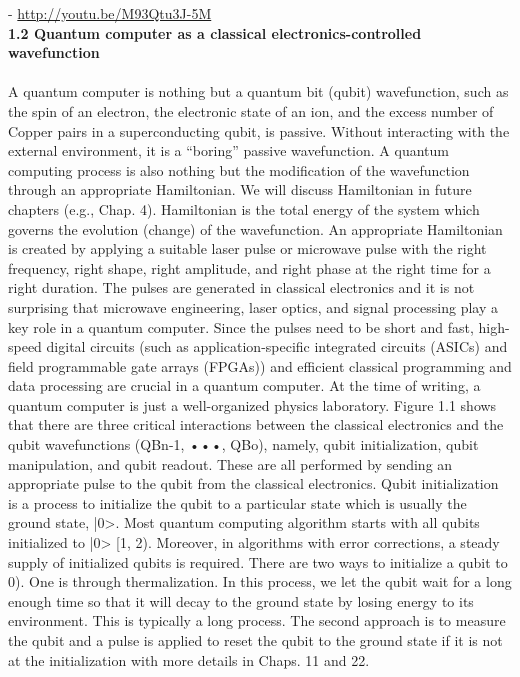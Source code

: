 \documentclass{article}
\begin{document}
- \url{http://youtu.be/M93Qtu3J-5M}
\\[20pt]
\textbf{\large1.2 Quantum computer as a classical electronics-controlled wavefunction
}
\\\\
A quantum computer is nothing but a quantum bit (qubit) wavefunction, such as the spin of an electron, the electronic state of an ion, and the excess number of Copper pairs in a superconducting qubit, is passive. Without interacting with the external environment, it is a “boring” passive wavefunction. A quantum computing process is also nothing but the modification of the wavefunction through an appropriate Hamiltonian. We will discuss Hamiltonian in future chapters (e.g., Chap. 4). Hamiltonian is the total energy of the system which governs the evolution (change) of the wavefunction. An appropriate Hamiltonian is created by applying a suitable laser pulse or microwave pulse with the right frequency, right shape, right amplitude, and right phase at the right time for a right duration. The pulses are generated in classical electronics and it is not surprising that microwave engineering, laser optics, and signal processing play a key role in a quantum computer. Since the pulses need to be short and fast, high-speed digital circuits (such as application-specific integrated circuits (ASICs) and field programmable gate arrays (FPGAs)) and efficient classical programming and data processing are crucial in a quantum computer.
At the time of writing, a quantum computer is just a well-organized physics laboratory.
Figure 1.1 shows that there are three critical interactions between the classical electronics and the qubit wavefunctions (QBn-1, •••, QBo), namely, qubit initialization, qubit manipulation, and qubit readout. These are all performed by sending an appropriate pulse to the qubit from the classical electronics.
Qubit initialization is a process to initialize the qubit to a particular state which is usually the ground state, |0>. Most quantum computing algorithm starts with all qubits initialized to |0> [1, 2). Moreover, in algorithms with error corrections, a steady supply of initialized qubits is required. There are two ways to initialize a qubit to 0). One is through thermalization. In this process, we let the qubit wait for a long enough time so that it will decay to the ground state by losing energy to its environment. This is typically a long process. The second approach is to measure the qubit and a pulse is applied to reset the qubit to the ground state if it is not at the initialization with more details in Chaps. 11 and 22.
\end{document}
